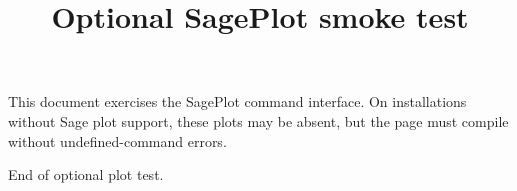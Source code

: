 \documentclass{ximera}
\title{Optional SagePlot smoke test}
\begin{document}
\maketitle

This document exercises the SagePlot command interface. On installations
without Sage plot support, these plots may be absent, but the page must
compile without undefined-command errors.

\begin{image}
\end{image}

\begin{image}
\end{image}

\begin{image}
\end{image}

End of optional plot test.
\end{document}
